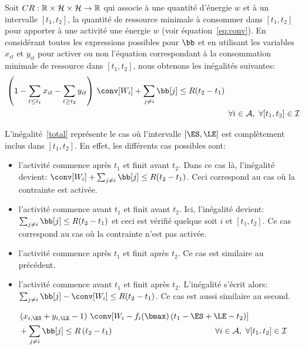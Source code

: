 Soit $CR: \mathbb{R} \times {\cal H} \times {\cal H} \rightarrow \mathbb{R}$ qui
associe à une quantité d'énergie $w$ et à un intervalle $[t_1,t_2]$,
la quantité de ressource minimale à consommer dans $[t_1,t_2]$ pour
apporter à une activité une énergie $w$ (voir
équation~\eqref{eq:conv}). En considérant toutes les
expressions possibles pour $\bb$ et en utilisant les variables
$x_{it}$ et $y_{it}$ pour activer ou non l'équation correspondant à la
consommation minimale de ressource dans $[t_1,t_2]$, nous obtenons les
inégalités suivantes: 
\begin{align}
&\left(1-\sum_{t\le t_1}x_{it} - \sum_{t\ge t_2}y_{it}\right) \, \conv[W_i] +
\sum_{j\neq i} \bb[j] \le R(t_2-t_1) \nonumber\\
& \hspace{9.55cm} \forall i \in {\cal A},\ \forall [t_1,t_2] \in \I
\label{total}
\end{align}


L'inégalité~\eqref{total} représente le cas où l'intervalle
$[\ES,\LE]$ est complètement inclus dans $[t_1,t_2]$. En effet,
les différents cas possibles sont: 
\begin{itemize}
\item l'activité commence après $t_1$ et finit avant $t_2$. Dans ce
  cas là, l'inégalité devient: $\conv[W_i] +\sum_{j\neq i} \bb[j] \le
  R(t_2-t_1)$. Ceci correspond au cas où la contrainte est activée. 
\item l'activité commence avant $t_1$ et finit avant $t_2$. Ici,
  l'inégalité devient: $\sum_{j\neq i} \bb[j] \le R(t_2-t_1)$ et ceci
  est vérifié quelque soit $i$ et $[t_1,t_2]$. Ce cas correspond au
  cas où la contrainte n'est pas activée. 
\item l'activité commence après $t_1$ et finit après $t_2$. Ce cas est
  similaire au précédent. 
\item l'activité commence avant $t_1$ et finit après
  $t_2$. L'inégalité s'écrit alors: $\sum_{j\neq i} \bb[j]-\conv[W_i]
  \le R(t_2-t_1)$. Ce cas est aussi similaire au second. 
\end{itemize}

\begin{align}
&\left(x_{i,\ES} + y_{i,\LE} -1 \right) \, \conv[W_i-f_i(\bmax)\left(t_1-\ES + \LE
-t_2\right)] \nonumber \\
&+ \sum_{j\neq i} \bb[j] \le R\left(t_2-t_1\right) \hspace{4.35cm} \forall i \in
{\cal A},\ \forall [t_1,t_2] \in \I  \label{both}
\end{align}

